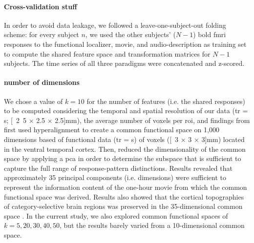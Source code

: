 \paragraph{Cross-validation stuff}


%
In order to avoid data leakage, we followed a leave-one-subject-out folding
scheme:
%
for every subject $n$, we used the other subjects' ($N-1$) \ac{bold} \ac{fmri}
responses to the functional localizer, movie, and audio-description as training
set to compute the shared feature space and transformation matrices for $N-1$
subjects.
The time series of all three paradigms were concatenated and z-scored.



\paragraph{number of dimensions}


We chose a value of $k=10$ for the number of features (i.e. the shared
responses) to be computed considering the temporal and spatial resolution of our
data (\ac{tr} = \unit[2]{s}; \unit[2.5 $\times$ 2.5 $\times$ 2.5]{mm}), the
average number of voxels per \ac{roi}, and findings from \citet{haxby2011common}
%
\citet{haxby2011common} first used hyperalignment to create a common functional
space on 1,000 dimensions based of functional data (\ac{tr} = \unit[3]{s}) of
voxels (\unit[3 $\times$ 3 $\times$ 3]{mm}) located in the ventral temporal
cortex.
%
Then, \citet{haxby2011common} reduced the dimensionality of the common space by
applying a \ac{pca} in order to determine the subspace that is sufficient to
capture the full range of response-pattern distinctions.
%
Results revealed that approximately 35 principal components (i.e. dimensions)
were sufficient to represent the information content of the one-hour movie from
which the common functional space was derived.
%
Results also showed that the cortical topographies of category-selective brain
regions was preserved in the 35-dimensional common space
\citep{haxby2011common}.
%
In the current study, we also explored common functional spaces of $k=5, 20, 30,
40, 50$, but the results barely varied from a 10-dimensional common space.


